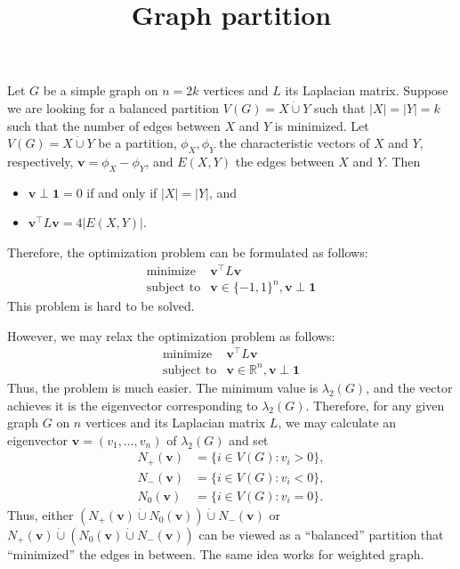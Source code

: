 \documentclass{article}
\title{Graph partition}
\date{\vspace{-1cm}}
\newcommand{\trans}{^\top}
\newcommand{\dunion}{\mathbin{\dot\cup}}
\newcommand{\bone}{\mathbf{1}}
\newcommand{\bv}{\mathbf{v}}
\theoremstyle{definition}
\begin{document}
\maketitle
\large

Let $G$ be a simple graph on $n = 2k$ vertices and $L$ its Laplacian matrix.  Suppose we are looking for a balanced partition $V(G) = X\dunion Y$ such that $|X| = |Y| = k$ such that the number of edges between $X$ and $Y$ is minimized.  Let $V(G) = X \dunion Y$ be a partition, $\phi_X, \phi_Y$ the characteristic vectors of $X$ and $Y$, respectively, $\bv = \phi_X - \phi_Y$, and $E(X,Y)$ the edges between $X$ and $Y$.  Then 
\begin{itemize}
\item $\bv\perp\bone = 0$ if and only if $|X| = |Y|$, and   
\item $\bv\trans L\bv = 4|E(X,Y)|$.  
\end{itemize}
Therefore, the optimization problem can be formulated as follows:
\[\begin{array}{rl}
\text{minimize} & \bv\trans L\bv \\ 
\text{subject to} & \bv\in \{-1,1\}^n, \bv\perp\bone
\end{array}\]
This problem is hard to be solved.

However, we may relax the optimization problem as follows:
\[\begin{array}{rl}
\text{minimize} & \bv\trans L\bv \\ 
\text{subject to} & \bv\in \mathbb{R}^n, \bv\perp\bone
\end{array}\]
Thus, the problem is much easier.  The minimum value is $\lambda_2(G)$, and the vector achieves it is the eigenvector corresponding to $\lambda_2(G)$.  Therefore, for any given graph $G$ on $n$ vertices and its Laplacian matrix $L$, we may calculate an eigenvector $\bv = (v_1,\ldots, v_n)$ of $\lambda_2(G)$ and set 
\[\begin{aligned}
 N_+(\bv) &= \{i\in V(G): v_i > 0 \}, \\ 
 N_-(\bv) &= \{i\in V(G): v_i < 0 \}, \\ 
 N_0(\bv) &= \{i\in V(G): v_i = 0 \}.
\end{aligned}\]
Thus, either $(N_+(\bv)\dunion N_0(\bv))\dunion N_-(\bv)$ or $N_+(\bv)\dunion (N_0(\bv)\dunion N_-(\bv))$ can be viewed as a ``balanced'' partition that ``minimized'' the edges in between.  The same idea works for weighted graph.
\end{document}
